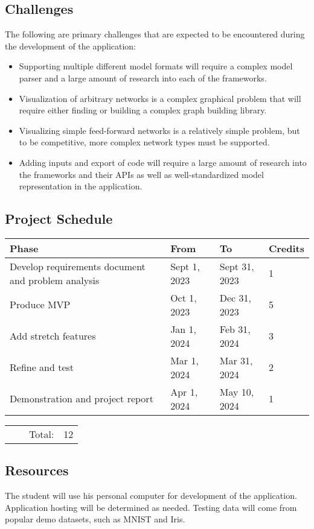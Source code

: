 \documentclass[letterpaper, 12pt]{report}
\begin{document}
\subsection*{Challenges}
The following are primary challenges that are expected to be encountered during the development of the application:
\begin{itemize}
    \item Supporting multiple different model formats will require a complex model parser and a large amount of research into each of the frameworks.
    \item Visualization of arbitrary networks is a complex graphical problem that will require either finding or building a complex graph building library.
    \item Visualizing simple feed-forward networks is a relatively simple problem, but to be competitive, more complex network types must be supported.
    \item Adding inputs and export of code will require a large amount of research into the frameworks and their APIs as well as well-standardized model representation in the application.
\end{itemize}

\subsection*{Project Schedule}
\begin{center}
    \begin{tabular}{ |m{16em}|m{7em}|m{7em}|m{4em}| }
        \hline
        \textbf{Phase} & \textbf{From} & \textbf{To} & \textbf{Credits} \\  
        \hline
        Develop requirements document and problem analysis & Sept 1, 2023 & Sept 31, 2023 & 1 \\
        \hline
        Produce MVP & Oct 1, 2023 & Dec 31, 2023 & 5 \\
        \hline
        Add stretch features & Jan 1, 2024 & Feb 31, 2024 & 3 \\
        \hline
        Refine and test & Mar 1, 2024 & Mar 31, 2024 & 2 \\
        \hline
        Demonstration and project report & Apr 1, 2024 & May 10, 2024 & 1 \\
        \hline
    \end{tabular}
    \begin{tabular}{ m{16em} m{7em} m{7em} m{4em} }
        & & Total: & 12 \\
    \end{tabular}
\end{center}

\subsection*{Resources}
The student will use his personal computer for development of the application. Application hosting will be determined as needed. Testing data will come from popular demo datasets, such as MNIST and Iris. 
\end{document}
